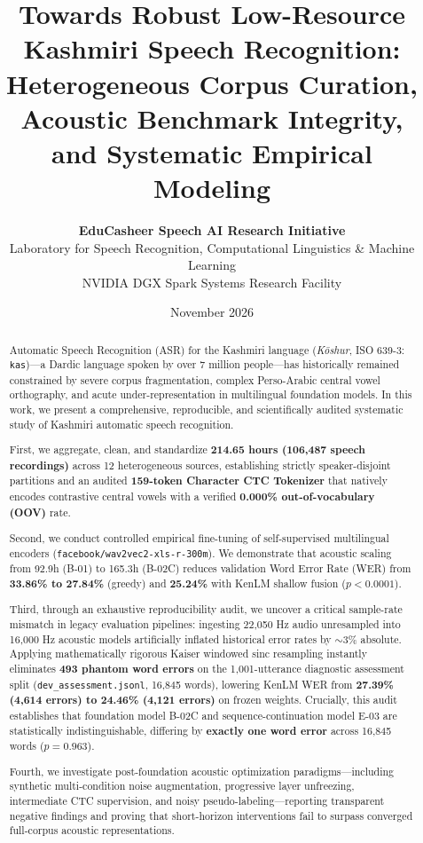 \documentclass[11pt,a4paper]{article}
\title{\textbf{Towards Robust Low-Resource Kashmiri Speech Recognition: \\ Heterogeneous Corpus Curation, Acoustic Benchmark Integrity, \\ and Systematic Empirical Modeling}}
\author{
  \textbf{EduCasheer Speech AI Research Initiative} \\
  Laboratory for Speech Recognition, Computational Linguistics \& Machine Learning \\
  NVIDIA DGX Spark Systems Research Facility
}
\date{November 2026}
\begin{document}
\maketitle

\begin{abstract}
Automatic Speech Recognition (ASR) for the Kashmiri language (\textit{Kōshur}, ISO 639-3: \texttt{kas})---a Dardic language spoken by over 7 million people---has historically remained constrained by severe corpus fragmentation, complex Perso-Arabic central vowel orthography, and acute under-representation in multilingual foundation models. In this work, we present a comprehensive, reproducible, and scientifically audited systematic study of Kashmiri automatic speech recognition. 

First, we aggregate, clean, and standardize \textbf{214.65 hours (106,487 speech recordings)} across 12 heterogeneous sources, establishing strictly speaker-disjoint partitions and an audited \textbf{159-token Character CTC Tokenizer} that natively encodes contrastive central vowels with a verified \textbf{0.000\% out-of-vocabulary (OOV)} rate. 

Second, we conduct controlled empirical fine-tuning of self-supervised multilingual encoders (\texttt{facebook/wav2vec2-xls-r-300m}). We demonstrate that acoustic scaling from 92.9h (B-01) to 165.3h (B-02C) reduces validation Word Error Rate (WER) from \textbf{33.86\% to 27.84\%} (greedy) and \textbf{25.24\%} with KenLM shallow fusion ($p < 0.0001$). 

Third, through an exhaustive reproducibility audit, we uncover a critical sample-rate mismatch in legacy evaluation pipelines: ingesting 22,050 Hz audio unresampled into 16,000 Hz acoustic models artificially inflated historical error rates by $\sim$3\% absolute. Applying mathematically rigorous Kaiser windowed sinc resampling instantly eliminates \textbf{493 phantom word errors} on the 1,001-utterance diagnostic assessment split (\texttt{dev\_assessment.jsonl}, 16,845 words), lowering KenLM WER from \textbf{27.39\% (4,614 errors) to 24.46\% (4,121 errors)} on frozen weights. Crucially, this audit establishes that foundation model B-02C and sequence-continuation model E-03 are statistically indistinguishable, differing by \textbf{exactly one word error} across 16,845 words ($p = 0.963$). 

Fourth, we investigate post-foundation acoustic optimization paradigms---including synthetic multi-condition noise augmentation, progressive layer unfreezing, intermediate CTC supervision, and noisy pseudo-labeling---reporting transparent negative findings and proving that short-horizon interventions fail to surpass converged full-corpus acoustic representations. 


\end{abstract}
\end{document}
